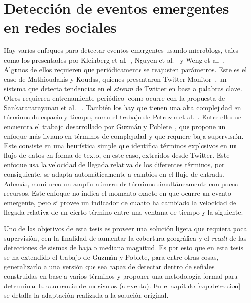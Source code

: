 \section{Detección de eventos emergentes en redes sociales}
\label{sec:deteccioneventos}

Hay varios enfoques para detectar eventos emergentes usando microblogs, tales como los presentados por Kleinberg et al.~\cite{kleinberg2003bursty}, Nguyen et al.~\cite{nguyen2013event} y Weng et al.~\cite{weng2011event}.
%
Algunos de ellos requieren que periódicamente se reajusten parámetros. Este es el caso de Mathioudakis y Koudas, quienes presentaron Twitter Monitor~\cite{mathioudakis2010twittermonitor}, un sistema que detecta tendencias en el {\em stream} de Twitter en base a palabras clave.
%
Otros requieren entrenamiento periódico, como ocurre con la propuesta de Sankaranarayanan et al.~ \cite{sankaranarayanan2009twitterstand}. 
%
También los hay que tienen una alta complejidad en términos de espacio y tiempo, como el trabajo de Petrovic et al.~\cite{petrovic2010streaming}.
%
Entre ellos se encuentra el trabajo desarrollado por Guzmán y Poblete~\cite{guzman2013line}, que propone un enfoque más liviano en términos de complejidad y que requiere baja supervisión.
%
Este consiste en una heurística simple que identifica términos explosivos en un flujo de datos en forma de texto, en este caso, extraídos desde Twitter. 
%
Este enfoque usa la velocidad de llegada relativa de los diferentes términos, por consiguiente, se adapta automáticamente a cambios en el flujo de entrada. 
%
Además, monitorea un amplio número de términos simultáneamente con pocos recursos.
%
Este enfoque no indica el momento exacto en que ocurre un evento emergente, pero si provee un indicador de cuanto ha cambiado la velocidad de llegada relativa de un cierto término entre una ventana de tiempo y la siguiente.


Uno de los objetivos de esta tesis es proveer una solución ligera que requiera poca supervisión, con la finalidad de aumentar la cobertura geográfica y el {\em recall} de las detecciones de sismos de baja o mediana magnitud.
%
Es por esto que en esta tesis se ha extendido el trabajo de Guzmán y Poblete, para entre otras cosas, generalizarlo a una versión que sea capaz de detectar dentro de señales construidas en base a varios términos y proponer una metodología formal para determinar la ocurrencia de un sismos (o evento).
%
En el capítulo \ref{cap:deteccion} se detalla la adaptación realizada a la solución original. 

